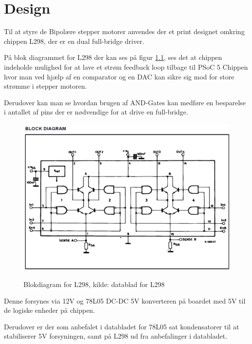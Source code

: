 \chapter{Design}

Til at styre de Bipolære stepper motorer anvendes der et print designet omkring chippen L298, der er en dual full-bridge driver.

På blok diagrammet for L298 der kan ses på figur \ref{blok298}, ses det at chippen indeholde mulighed for at lave et strøm feedback loop tilbage til PSoC 5 Chippen hvor man ved hjælp af en comparator og en DAC kan sikre sig mod for store strømme i stepper motoren. 

Derudover kan man se hvordan brugen af AND-Gates kan medføre en besparelse i antallet af pins der er nødvendige for at drive en full-bridge.

\begin{figure}[H]
	\centering
	\caption{Blokdiagram for L298, kilde: datablad for L298}
	\includegraphics[scale=0.5]{billeder/blokdiagramL298}
	\label{blok298}
\end{figure}

Denne forsynes via 12V og 78L05 DC-DC 5V konverteren på boardet med 5V til de logiske enheder på chippen.

Derudover er der som anbefalet i databladet for 78L05 sat kondensatorer til at stabiliserer 5V forsyningen, samt på L298 ud fra anbefalinger i databladet.

